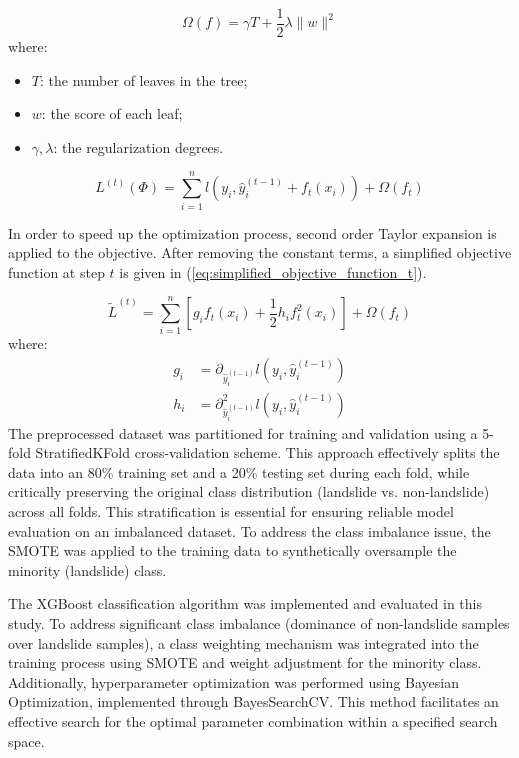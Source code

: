 \begin{equation} \label{eq:regularization_term}
\Omega(f) = \gamma T + \frac{1}{2} \lambda \|w\|^2
\end{equation}
where:
\begin{itemize}
    \item $T$: the number of leaves in the tree;
    \item $w$: the score of each leaf;
    \item $\gamma, \lambda$: the regularization degrees.
\end{itemize}

\begin{equation} \label{eq:objective_function_t}
L^{(t)}(\Phi) = \sum_{i=1}^n l(y_i, \hat{y}_i^{(t-1)} + f_t(x_i)) + \Omega(f_t)
\end{equation}

In order to speed up the optimization process, second order Taylor expansion is applied to the objective. After removing the constant terms, a simplified objective function at step $t$ is given in (\ref{eq:simplified_objective_function_t}).

\begin{equation} \label{eq:simplified_objective_function_t}
\tilde{L}^{(t)} = \sum_{i=1}^n \left[ g_i f_t(x_i) + \frac{1}{2} h_i f_t^2(x_i) \right] + \Omega(f_t)
\end{equation}
where:
\begin{align} \label{eq:g_h_definitions}
g_i &= \partial_{\hat{y}_i^{(t-1)}} l(y_i, \hat{y}_i^{(t-1)}) \\
h_i &= \partial_{\hat{y}_i^{(t-1)}}^2 l(y_i, \hat{y}_i^{(t-1)})
\end{align}
The preprocessed dataset was partitioned for training and validation using a 5-fold StratifiedKFold cross-validation scheme\cite{mthd06}. This approach effectively splits the data into an 80\% training set and a 20\% testing set during each fold, while critically preserving the original class distribution (landslide vs. non-landslide) across all folds. This stratification is essential for ensuring reliable model evaluation on an imbalanced dataset. To address the class imbalance issue, the SMOTE was applied to the training data to synthetically oversample the minority (landslide) class\cite{mthd07}.

The XGBoost classification algorithm was implemented and evaluated in this study. To address significant class imbalance (dominance of non-landslide samples over landslide samples), a class weighting mechanism was integrated into the training process using SMOTE and weight adjustment for the minority class. Additionally, hyperparameter optimization was performed using Bayesian Optimization, implemented through BayesSearchCV\cite{mthd08}. This method facilitates an effective search for the optimal parameter combination within a specified search space.

